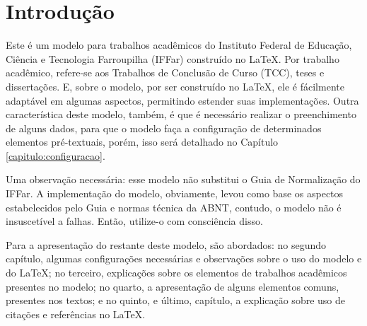 \chapter{Introdução}
Este é um modelo para trabalhos acadêmicos do Instituto Federal de Educação, Ciência e Tecnologia Farroupilha (IFFar) construído no \LaTeX{}. Por trabalho acadêmico, refere-se aos Trabalhos de Conclusão de Curso (TCC), teses e dissertações. E, sobre o modelo, por ser construído no \LaTeX, ele é fácilmente adaptável em algumas aspectos, permitindo estender suas implementações. Outra característica deste modelo, também, é que é necessário realizar o preenchimento de alguns dados, para que o modelo faça a configuração de determinados elementos pré-textuais, porém, isso será detalhado no Capítulo \ref{capitulo:configuracao}.

Uma observação necessária: esse modelo não substitui o Guia de Normalização do IFFar. A implementação do modelo, obviamente, levou como base os aspectos estabelecidos pelo Guia e normas técnica da ABNT, contudo, o modelo não é insuscetível a falhas. Então, utilize-o com consciência disso.

Para a apresentação do restante deste modelo, são abordados: no segundo capítulo, algumas configurações necessárias e observações sobre o uso do modelo e do \LaTeX; no terceiro, explicações sobre os elementos de trabalhos acadêmicos presentes no modelo; no quarto, a apresentação de alguns elementos comuns, presentes nos textos; e no quinto, e último, capítulo, a explicação sobre uso de citações e referências no \LaTeX.